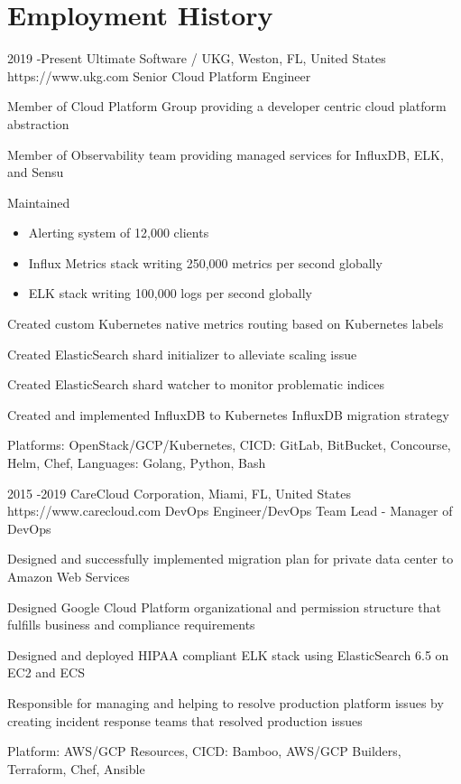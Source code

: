\documentclass[10pt]{article} %
\begin{document}
\section{Employment History}
\job
{2019 -}{Present}
{Ultimate Software / UKG, Weston, FL, United States}
{https://www.ukg.com}
{Senior Cloud Platform Engineer}
{\begin{itemize-noindent}
\item{Member of Cloud Platform Group providing a developer centric cloud platform abstraction}
\item{Member of Observability team providing managed services for InfluxDB, ELK, and Sensu}
\item{Maintained}
  \begin{itemize}
    \item{Alerting system of 12,000 clients}
    \item{Influx Metrics stack writing 250,000 metrics per second globally}
    \item{ELK stack writing 100,000 logs per second globally}
  \end{itemize}
\item{Created custom Kubernetes native metrics routing based on Kubernetes labels}
\item{Created ElasticSearch shard initializer to alleviate scaling issue}
\item{Created ElasticSearch shard watcher to monitor problematic indices}
\item{Created and implemented InfluxDB to Kubernetes InfluxDB migration strategy}
\item{Platforms: OpenStack/GCP/Kubernetes, CICD: GitLab, BitBucket, Concourse, Helm, Chef, Languages: Golang, Python, Bash}
\end{itemize-noindent}}
\job
{2015 -}{2019}
{CareCloud Corporation, Miami, FL, United States}
{https://www.carecloud.com}
{DevOps Engineer/DevOps Team Lead - Manager of DevOps}
{\begin{itemize-noindent}
\item{Designed and successfully implemented migration plan for private data center to Amazon Web Services}
\item{Designed Google Cloud Platform organizational and permission structure that fulfills business and compliance requirements}
\item{Designed and deployed HIPAA compliant ELK stack using ElasticSearch 6.5 on EC2 and ECS}
\item{Responsible for managing and helping to resolve production platform issues by creating incident response teams that resolved production issues}
\item{Platform: AWS/GCP Resources, CICD: Bamboo, AWS/GCP Builders, Terraform, Chef, Ansible}
\end{itemize-noindent}}
\end{document}
